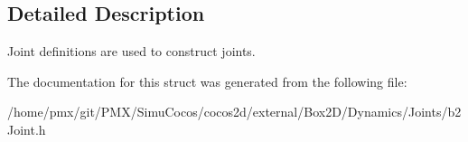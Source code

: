 \subsection{Detailed Description}
Joint definitions are used to construct joints. 

The documentation for this struct was generated from the following file\+:\begin{DoxyCompactItemize}
\item 
/home/pmx/git/\+P\+M\+X/\+Simu\+Cocos/cocos2d/external/\+Box2\+D/\+Dynamics/\+Joints/b2\+Joint.\+h\end{DoxyCompactItemize}
